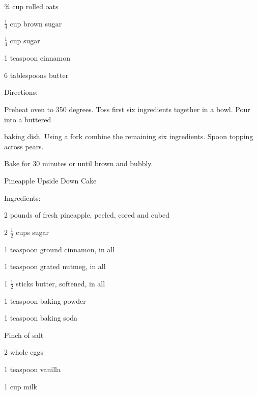 \documentclass[a4paper,portrait,12pt]{book}
\begin{document}
¾ cup rolled oats




$\frac{1}{4}$ cup brown sugar




$\frac{1}{4}$ cup sugar




1 teaspoon cinnamon




6 tablespoons butter




Directions:




Preheat oven to 350 degrees. Toss first six ingredients together in a bowl. Pour into a buttered




baking dish. Using a fork combine the remaining six ingredients. Spoon topping across pears.




Bake for 30 minutes or until brown and bubbly.







\newpage
Pineapple Upside Down Cake




Ingredients:




2 pounds of fresh pineapple, peeled, cored and cubed




2 $\frac{1}{2}$ cups sugar




1 teaspoon ground cinnamon, in all




1 teaspoon grated nutmeg, in all




1 $\frac{1}{2}$ sticks butter, softened, in all




1 teaspoon baking powder




1 teaspoon baking soda




Pinch of salt




2 whole eggs




1 teaspoon vanilla




1 cup milk
\end{document}
